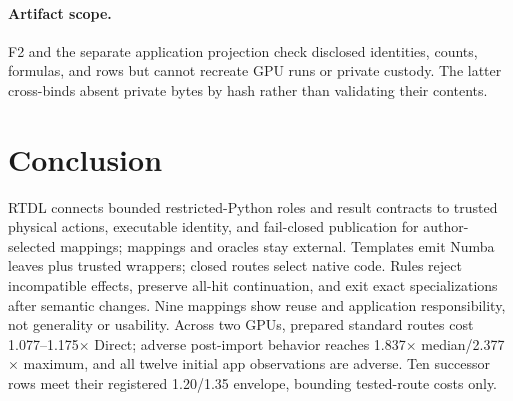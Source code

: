 \documentclass[sigplan,screen,review,anonymous]{acmart}
\newcommand{\rtdl}{\textsc{RTDL}\xspace}
\begin{document}
\paragraph{Artifact scope.}
F2 and the separate application projection check disclosed identities, counts,
formulas, and rows but cannot recreate GPU runs or private custody. The latter
cross-binds absent private bytes by hash rather than validating their contents.

\section{Conclusion}

\rtdl connects bounded restricted-Python roles and result contracts to trusted
physical actions, executable identity, and fail-closed publication for
author-selected mappings; mappings and oracles stay external. Templates emit
Numba leaves plus trusted wrappers; closed routes select native code. Rules
reject incompatible effects, preserve all-hit continuation, and exit exact
specializations after semantic changes. Nine mappings show reuse and application
responsibility, not generality or usability. Across two GPUs, prepared standard
routes cost 1.077--1.175$\times$ Direct; adverse post-import behavior reaches
1.837$\times$ median/2.377$\times$ maximum, and all twelve initial app
observations are adverse. Ten successor rows meet their registered 1.20/1.35
envelope, bounding tested-route costs only.



\end{document}
